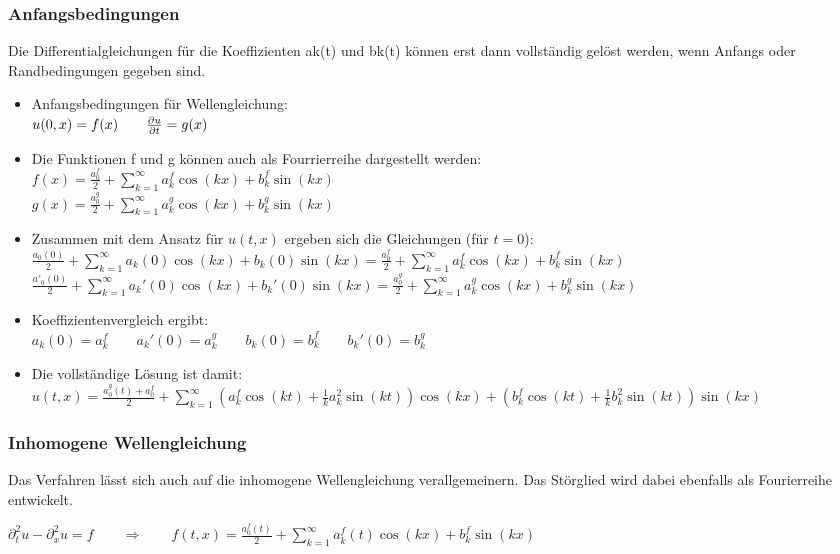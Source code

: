 \subsubsection{Anfangsbedingungen}
Die Differentialgleichungen für die Koeffizienten ak(t) und bk(t) können erst dann
vollständig gelöst werden, wenn Anfangs oder Randbedingungen gegeben sind.\\
\begin{itemize}
\item Anfangsbedingungen für Wellengleichung:\\
\quad $u(0,x)=f(x)\qquad \frac{\partial u}{\partial t}=g(x)$
\item Die Funktionen f und g können auch als Fourrierreihe dargestellt werden:\\
$f(x)=\frac{a_0^f}{2}+\sum\limits_{k=1}^{\infty}{a^f_k\cos(kx)+b^f_k\sin(kx)}$\\[0.2cm]
$g(x)=\frac{a_0^g}{2}+\sum\limits_{k=1}^{\infty}{a^g_k\cos(kx)+b^g_k\sin(kx)}$
\item Zusammen mit dem Ansatz für $u(t,x)$ ergeben sich die Gleichungen (für $t=0$):\\
$\frac{a_0(0)}{2}+\sum\limits_{k=1}^{\infty}{a_k(0)\cos(kx)+b_k(0)\sin(kx)}=\frac{a_0^f}{2}+\sum\limits_{k=1}^{\infty}{a_k^f\cos(kx)+b^f_k\sin(kx)}$\\[0.2cm]
$\frac{a'_0(0)}{2}+\sum\limits_{k=1}^{\infty}{a_k'(0)\cos(kx)+b_k'(0)\sin(kx)}=\frac{a_0^g}{2}+\sum\limits_{k=1}^{\infty}{a_k^g\cos(kx)+b^g_k\sin(kx)}$
\item Koeffizientenvergleich ergibt:\\
$a_k(0)=a_k^f\qquad a_k'(0)=a_k^g\qquad b_k(0)=b_k^f\qquad b_k'(0)=b_k^g$
\item Die vollständige Lösung ist damit:\\
$u(t,x)=\frac{a_0^g(t)+a_0^f}2+\sum\limits_{k=1}^{\infty}{\left(a_k^f\cos(kt)+\frac 1k a_k^2\sin(kt)\right)\cos(kx)+\left(b_k^f\cos(kt)+\frac 1k b_k^2\sin(kt)\right)}\sin(kx)$
\end{itemize}

\subsubsection{Inhomogene Wellengleichung}

Das Verfahren lässt sich auch auf die inhomogene Wellengleichung verallgemeinern. Das Störglied wird dabei ebenfalls als Fourierreihe entwickelt.

$\partial_t^2u-\partial_x^2u=f \qquad \Rightarrow \qquad f(t,x)=\frac{a_0^f(t)}{2}+\sum\limits_{k=1}^{\infty}{a^f_k(t)\cos(kx)+b^f_k\sin(kx)}$




